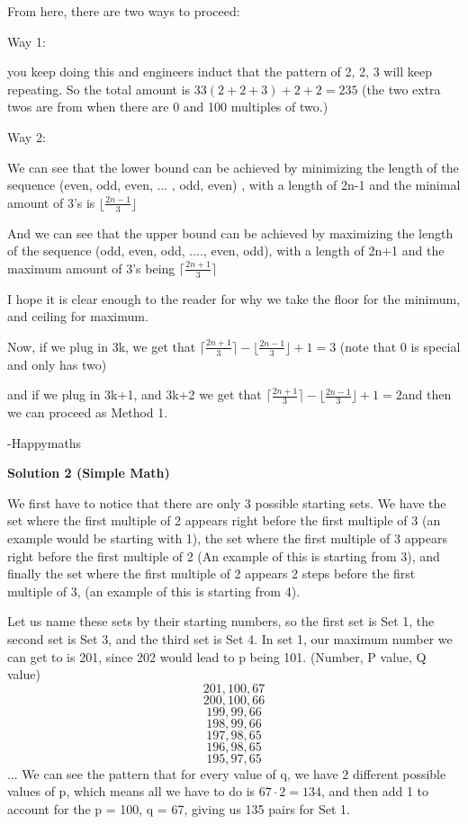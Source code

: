\begin{enumerate}
 From here, there are two ways to proceed:

 Way 1:

 you keep doing this and engineers induct that the pattern of 2, 2, 3 will keep repeating. So the total amount is $33(2+2+3)+2+2=\boxed{235}$ (the two extra twos are from when there are 0 and 100 multiples of two.)

 Way 2:

 We can see that the lower bound can be achieved by minimizing the length of the sequence (even, odd, even, ... , odd, even) , with a length of 2n-1 and the minimal amount of 3's is $\lfloor \frac{2n-1}{3} \rfloor$

 And we can see that the upper bound can be achieved by maximizing the length of the sequence (odd, even, odd, ...., even, odd), with a length of 2n+1 and the maximum amount of 3's being $\lceil \frac{2n+1}{3} \rceil$

 I hope it is clear enough to the reader for why we take the floor for the minimum, and ceiling for maximum.

 Now, if we plug in 3k, we get that $\lceil \frac{2n+1}{3} \rceil- \lfloor \frac{2n-1}{3} \rfloor+1=3$ (note that 0 is special and only has two)

 and if we plug in 3k+1, and 3k+2 we get that $\lceil \frac{2n+1}{3} \rceil- \lfloor \frac{2n-1}{3} \rfloor+1=2$and then we can proceed as Method 1.

 -Happymaths

 



\textbf{Solution 2 (Simple Math)}

We first have to notice that there are only 3 possible starting sets. We have the set where the first multiple of 2 appears right before the first multiple of 3 (an example would be starting with 1), the set where the first multiple of 3 appears right before the first multiple of 2 (An example of this is starting from 3), and finally the set where the first multiple of 2 appears 2 steps before the first multiple of 3, (an example of this is starting from 4). 

 Let us name these sets by their starting numbers, so the first set is Set 1, the second set is Set 3, and the third set is Set 4. In set 1, our maximum number we can get to is 201, since 202 would lead to p being 101. (Number, P value, Q value)
 \[201, 100, 67\] 
 \[200, 100, 66\] 
 \[199, 99, 66\]
 \[198, 99, 66\]
 \[197, 98, 65\] 
 \[196, 98, 65\]
 \[195, 97, 65\] ... We can see the pattern that for every value of q, we have 2 different possible values of p, which means all we have to do is $67\cdot2=134$, and then add 1 to account for the p = 100, q = 67, giving us 135 pairs for Set 1. 


\end{enumerate}
